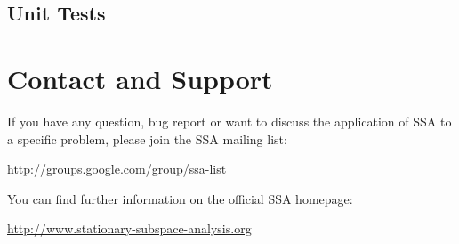 \documentclass{article}
\newcommand{\1}{\ensuremath{\mathds{1}}}
\newcommand{\0}{\ensuremath{0}}
\begin{document}
\subsection*{Unit Tests}


\section{Contact and Support}

If you have any question, bug report or want to discuss the application of SSA
to a specific problem, please join the SSA mailing list:
\begin{center}
        \url{http://groups.google.com/group/ssa-list}
\end{center}
You can find further
information on the official SSA homepage: 
\begin{center}
	\url{http://www.stationary-subspace-analysis.org}
\end{center}




\end{document}
